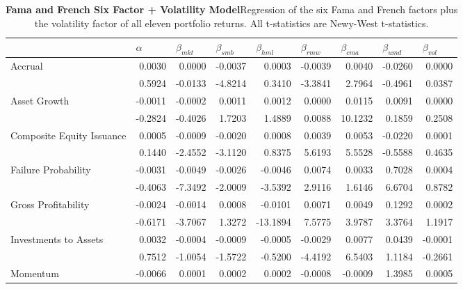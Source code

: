 \begin{sidewaystable}[htbp]
\centering
\scriptsize
\caption[Fama and French Six Factor + Volatility Model]{\textbf{Fama and French Six Factor + Volatility Model}\newline Regression of the six Fama and French factors plus the volatility factor of all eleven portfolio returns. All t-statistics are Newy-West t-statistics.}
\label{tab:ff6v}
\begin{tabular}{@{}lrrrrrrrr@{}}
\toprule
& \multicolumn{1}{l}{$\alpha$} & \multicolumn{1}{l}{$\beta_{mkt}$} & \multicolumn{1}{l}{$\beta_{smb}$} & \multicolumn{1}{l}{$\beta_{hml}$} & \multicolumn{1}{l}{$\beta_{rmw}$} & \multicolumn{1}{l}{$\beta_{cma}$} & \multicolumn{1}{l}{$\beta_{umd}$} & \multicolumn{1}{l}{$\beta_{vol}$} \\ \midrule
\multirow{2}{*}{Accrual} & 0.0030 & 0.0000 & -0.0037 & 0.0003 & -0.0039 & 0.0040 & -0.0260 & 0.0000 \\
& 0.5924 & -0.0133 & -4.8214 & 0.3410 & -3.3841 & 2.7964 & -0.4961 & 0.0387 \\
\multirow{2}{*}{Asset Growth} & -0.0011 & -0.0002 & 0.0011 & 0.0012 & 0.0000 & 0.0115 & 0.0091 & 0.0000 \\
& -0.2824 & -0.4026 & 1.7203 & 1.4889 & 0.0088 & 10.1232 & 0.1859 & 0.2508 \\
\multirow{2}{*}{Composite Equity Issuance} & 0.0005 & -0.0009 & -0.0020 & 0.0008 & 0.0039 & 0.0053 & -0.0220 & 0.0001 \\
& 0.1440 & -2.4552 & -3.1120 & 0.8375 & 5.6193 & 5.5528 & -0.5588 & 0.4635 \\
\multirow{2}{*}{Failure Probability} & -0.0031 & -0.0049 & -0.0026 & -0.0046 & 0.0074 & 0.0033 & 0.7028 & 0.0004 \\
& -0.4063 & -7.3492 & -2.0009 & -3.5392 & 2.9116 & 1.6146 & 6.6704 & 0.8782 \\
\multirow{2}{*}{Gross Profitability} & -0.0024 & -0.0014 & 0.0008 & -0.0101 & 0.0071 & 0.0049 & 0.1292 & 0.0002 \\
& -0.6171 & -3.7067 & 1.3272 & -13.1894 & 7.5775 & 3.9787 & 3.3764 & 1.1917 \\
\multirow{2}{*}{Investments to Assets} & 0.0032 & -0.0004 & -0.0009 & -0.0005 & -0.0029 & 0.0077 & 0.0439 & -0.0001 \\
& 0.7512 & -1.0054 & -1.5722 & -0.5200 & -4.4192 & 6.5403 & 1.1184 & -0.2661 \\
\multirow{2}{*}{Momentum} & -0.0066 & 0.0001 & 0.0002 & 0.0002 & -0.0008 & -0.0009 & 1.3985 & 0.0005 \\

\end{tabular}
\end{sidewaystable}
